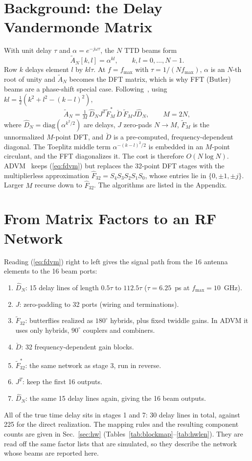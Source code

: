 \documentclass[conference]{IEEEtran}
\begin{document}
\section{Background: the Delay Vandermonde Matrix}
With unit delay $\tau$ and $\alpha=e^{-j\omega\tau}$, the $N$ TTD beams form
\begin{equation}
\tilde{A}_N[k,l] = \alpha^{kl}, \qquad k,l = 0,\dots,N-1 .
\end{equation}
Row $k$ delays element $l$ by $kl\tau$. At $f=f_{\max}$ with $\tau = 1/(Nf_{\max})$, $\alpha$ is an $N$-th root of unity and $\tilde{A}_N$ becomes the DFT matrix, which is why FFT (Butler) beams are a phase-shift special case. Following~\cite{perera2022}, using $kl = \tfrac12\left(k^2+l^2-(k-l)^2\right)$,
\begin{equation}
\tilde{A}_N = \tfrac{1}{M}\,\hat{D}_N J^{T} \tilde{F}_M^{*}\, \breve{D}\, \tilde{F}_M J \hat{D}_N, \qquad M=2N,
\label{eq:fdvm}
\end{equation}
where $\hat{D}_N=\mathrm{diag}(\alpha^{k^2/2})$ are delays, $J$ zero-pads $N\to M$, $\tilde{F}_M$ is the unnormalized $M$-point DFT, and $\breve{D}$ is a pre-computed, frequency-dependent diagonal. The Toeplitz middle term $\alpha^{-(k-l)^2/2}$ is embedded in an $M$-point circulant, and the FFT diagonalizes it. The cost is therefore $O(N\log N)$. ADVM~\cite{perera2025} keeps (\ref{eq:fdvm}) but replaces the 32-point DFT stages with the multiplierless approximation $\hat{F}_{32}=S_4S_3S_2S_1S_0$, whose entries lie in $\{0,\pm1,\pm j\}$. Larger $M$ recurse down to $\hat{F}_{32}$. The algorithms are listed in the Appendix.

\section{From Matrix Factors to an RF Network}\label{sec:bridge}
Reading (\ref{eq:fdvm}) right to left gives the signal path from the 16 antenna elements to the 16 beam ports:
\begin{enumerate}
\item $\hat{D}_N$: 15 delay lines of length $0.5\tau$ to $112.5\tau$ ($\tau=6.25$~ps at $f_{\max}=10$~GHz).
\item $J$: zero-padding to 32 ports (wiring and terminations).
\item $\tilde{F}_{32}$: butterflies realized as $180^\circ$ hybrids, plus fixed twiddle gains. In ADVM it uses only hybrids, $90^\circ$ couplers and combiners.
\item $\breve{D}$: 32 frequency-dependent gain blocks.
\item $\tilde{F}^{*}_{32}$: the same network as stage 3, run in reverse.
\item $J^{T}$: keep the first 16 outputs.
\item $\hat{D}_N$: the same 15 delay lines again, giving the 16 beam outputs.
\end{enumerate}
All of the true time delay sits in stages 1 and 7: 30 delay lines in total, against 225 for the direct realization. The mapping rules and the resulting component counts are given in Sec.~\ref{sec:hw} (Tables~\ref{tab:blockmap}--\ref{tab:hwlen}). They are read off the same factor lists that are simulated, so they describe the network whose beams are reported here.
\end{document}
